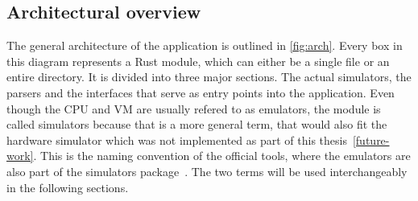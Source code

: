 
\subsection{Architectural overview}
The general architecture of the application is outlined in \cref{fig:arch}. Every box in this diagram represents a Rust module, which can either be a single file or an entire directory.
It is divided into three major sections. The actual simulators, the parsers and the interfaces that serve as entry points into the application. Even though the CPU and VM are usually refered to as emulators, the module is called simulators because that is a more general term, that would also fit the hardware simulator which was not implemented as part of this thesis~\ref{future-work}. This is the naming convention of the official tools, where the emulators are also part of the simulators package~\cite{n2tsimulators}. The two terms will be used interchangeably in the following sections.


